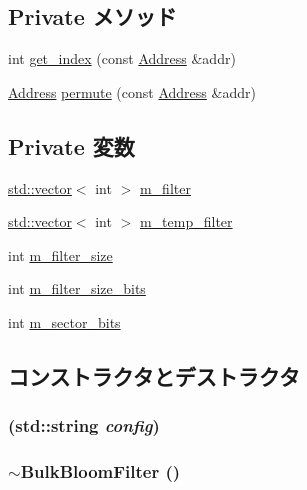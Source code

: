 \subsection*{Private メソッド}
\begin{DoxyCompactItemize}
\item 
int \hyperlink{classBulkBloomFilter_a0a9fd2f2f75033080fc27830f7c0fe64}{get\_\-index} (const \hyperlink{classAddress}{Address} \&addr)
\item 
\hyperlink{classAddress}{Address} \hyperlink{classBulkBloomFilter_a63252da8c7a655ee605b6bfeebf04b40}{permute} (const \hyperlink{classAddress}{Address} \&addr)
\end{DoxyCompactItemize}
\subsection*{Private 変数}
\begin{DoxyCompactItemize}
\item 
\hyperlink{classstd_1_1vector}{std::vector}$<$ int $>$ \hyperlink{classBulkBloomFilter_aae3fd71ce4b5e8910aa63829ba6abd41}{m\_\-filter}
\item 
\hyperlink{classstd_1_1vector}{std::vector}$<$ int $>$ \hyperlink{classBulkBloomFilter_ac3f1f95f7f292549371b599b945e9e0a}{m\_\-temp\_\-filter}
\item 
int \hyperlink{classBulkBloomFilter_af53abddc4707ab403450239a6e94c486}{m\_\-filter\_\-size}
\item 
int \hyperlink{classBulkBloomFilter_a5c26703945ae76ff80ec6951cccea29c}{m\_\-filter\_\-size\_\-bits}
\item 
int \hyperlink{classBulkBloomFilter_a207a98f5eec97a24c867c9b015435435}{m\_\-sector\_\-bits}
\end{DoxyCompactItemize}


\subsection{コンストラクタとデストラクタ}
\hypertarget{classBulkBloomFilter_a61c3f64e7f052ede2aa2c0db43203514}{
\subsubsection[{BulkBloomFilter}]{ (std::string {\em config})}}
\label{classBulkBloomFilter_a61c3f64e7f052ede2aa2c0db43203514}
\hypertarget{classBulkBloomFilter_a69cb69eb468fd0e88f894a717c5ac7e1}{
\subsubsection[{$\sim$BulkBloomFilter}]{\setlength{\rightskip}{0pt plus 5cm}$\sim${\bf BulkBloomFilter} ()}}
\label{classBulkBloomFilter_a69cb69eb468fd0e88f894a717c5ac7e1}



